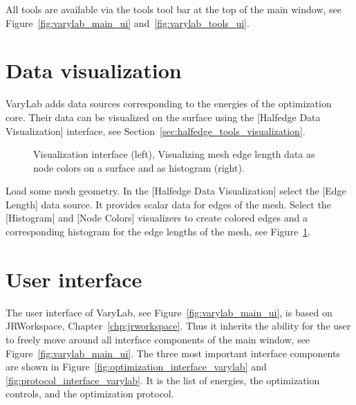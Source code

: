 \documentclass[Thesis.tex]{subfiles}
\begin{document}
All tools are available via the tools tool bar at the top of the main window, see Figure~\ref{fig:varylab_main_ui} and~\ref{fig:varylab_tools_ui}.

\section{Data visualization}

{\sc VaryLab} adds data sources corresponding to the energies of the optimization core. Their data can be visualized on the surface using the [Halfedge Data Visualization] interface, see Section~\ref{sec:halfedge_tools_visualization}. 

\begin{figure}
    \begin{center}
    \caption{Visualization interface (left), Visualizing mesh edge length data as node colors on a surface and as histogram (right).}
    \label{fig:visualizing_edge_lengths}
    \end{center}
\end{figure}

\begin{example} Load some mesh geometry. In the [Halfedge Data Visualization] select the [Edge Length] data source. It provides scalar data for edges of the mesh. Select the [Histogram] and [Node Colors] visualizers to create colored edges and a corresponding histogram for the edge lengths of the mesh, see Figure~\ref{fig:visualizing_edge_lengths}.
\end{example}

\section{User interface}
\label{sec:ui_varylab}

The user interface of {\sc VaryLab}, see Figure~\ref{fig:varylab_main_ui}, is based on {\sc JRWorkspace}, Chapter~\ref{chp:jrworkspace}. Thus it inherits the ability for the user to freely move around all interface components of the main window, see Figure~\ref{fig:varylab_main_ui}. 
The three most important interface components are shown in Figure~\ref{fig:optimization_interface_varylab} and \ref{fig:protocol_interface_varylab}. It is the list of energies, the optimization controls, and the optimization protocol.
\end{document}
